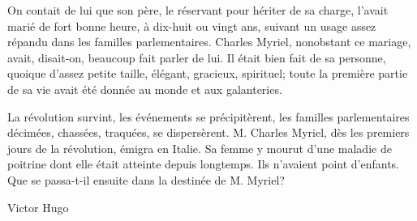 \documentclass[a4paper,12pt]{article}
\begin{document}
On contait de lui que son père, le réservant pour hériter de sa charge,
l'avait marié de fort bonne heure, à dix-huit ou vingt ans, suivant un
usage assez répandu dans les familles parlementaires. Charles Myriel,
nonobstant ce mariage, avait, disait-on, beaucoup fait parler de lui. Il
était bien fait de sa personne, quoique d'assez petite taille, élégant,
gracieux, spirituel; toute la première partie de sa vie avait été donnée
au monde et aux galanteries.

 La révolution survint, les événements se
précipitèrent, les familles parlementaires décimées, chassées, traquées,
se dispersèrent. M. Charles Myriel, dès les premiers jours de la
révolution, émigra en Italie. Sa femme y mourut d'une maladie de
poitrine dont elle était atteinte depuis longtemps. Ils n'avaient point
d'enfants. Que se passa-t-il ensuite dans la destinée de M. Myriel?


\vspace{1cm}
\hspace{10cm} Victor Hugo
\end{document}

